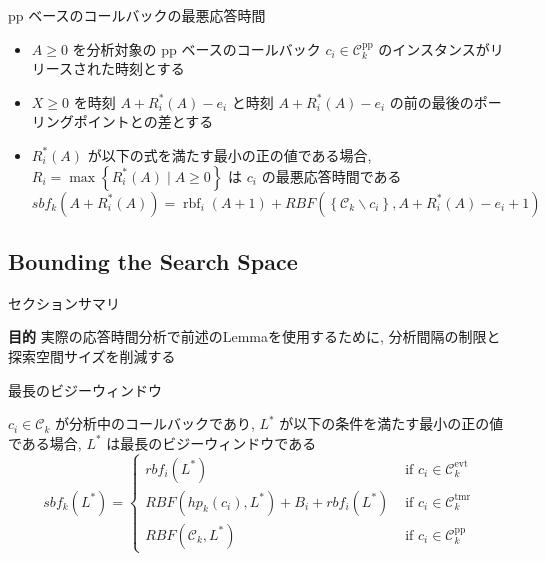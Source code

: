 \begin{frame}[label=lemma4]{pp ベースのコールバックの最悪応答時間}
    \begin{lemma}[pp ベースのコールバックの最悪応答時間]
        \begin{itemize}
            \item $A \geq 0$ を分析対象の pp ベースのコールバック $c_{i} \in \mathcal{C}_{k}^{\mathrm{pp}}$ のインスタンスがリリースされた時刻とする
            \item $X \geq 0$ を時刻 $A+R_{i}^{*}(A)-e_{i}$ と時刻 $A+R_{i}^{*}(A)-e_{i}$ の前の最後のポーリングポイントとの差とする
            \item $R_{i}^{*}(A)$ が以下の式を満たす最小の正の値である場合,  $R_{i}=\max \left\{R_{i}^{*}(A) \mid A \geq 0\right\}$ は $c_{i}$ の最悪応答時間である
                  \begin{equation*}
                      s b f_{k}\left(A+R_{i}^{*}(A)\right)=\operatorname{rbf}_{i}(A+1)+R B F\left(\left\{\mathcal{C}_{k} \backslash c_{i}\right\}, A+R_{i}^{*}(A)-e_{i}+1\right)
                  \end{equation*}
        \end{itemize}
    \end{lemma}
\end{frame}


\subsection{Bounding the Search Space}
\label{ssec: bounding the search space}

\begin{frame}{セクションサマリ}
    \begin{itembox}[l]{\textbf{目的}}
        実際の応答時間分析で前述のLemmaを使用するために,  分析間隔の制限と探索空間サイズを削減する
    \end{itembox}
\end{frame}

\begin{frame}[label=lemma6]{最長のビジーウィンドウ}
    \begin{lemma}[]
        $c_{i} \in \mathcal{C}_{k}$ が分析中のコールバックであり, $L^{*}$ が以下の条件を満たす最小の正の値である場合, $L^{*}$ は最長のビジーウィンドウである
        \begin{equation*}
            s b f_{k}\left(L^{*}\right)= \begin{cases}r b f_{i}\left(L^{*}\right) & \text { if } c_{i} \in \mathcal{C}_{k}^{\mathrm{evt}} \\ R B F\left(h p_{k}\left(c_{i}\right), L^{*}\right)+B_{i}+r b f_{i}\left(L^{*}\right) & \text { if } c_{i} \in \mathcal{C}_{k}^{\mathrm{tmr}} \\ R B F\left(\mathcal{C}_{k}, L^{*}\right) & \text { if } c_{i} \in \mathcal{C}_{k}^{\mathrm{pp}}\end{cases}
        \end{equation*}
    \end{lemma}
\end{frame}

